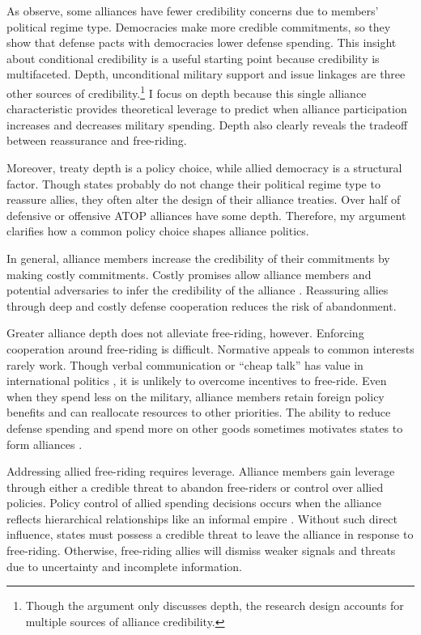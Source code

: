 \documentclass[12pt]{article}
\begin{document}
As \citet{DigiuseppePoast2016} observe, some alliances have fewer credibility concerns due to members' political regime type.
Democracies make more credible commitments, so they show that defense pacts with democracies lower defense spending.
This insight about conditional credibility is a useful starting point because credibility is multifaceted. 
Depth, unconditional military support \citep{Benson2012, Chibaetal2015} and issue linkages \citep{LongLeeds2006, Poast2012, Poast2013} are three other sources of credibility.\footnote{Though the argument only discusses depth, the research design accounts for multiple sources of alliance credibility.} 
I focus on depth because this single alliance characteristic provides theoretical leverage to predict when alliance participation increases and decreases military spending. 
Depth also clearly reveals the tradeoff between reassurance and free-riding.  


Moreover, treaty depth is a policy choice, while allied democracy is a structural factor. 
Though states probably do not change their political regime type to reassure allies, they often alter the design of their alliance treaties. 
Over half of defensive or offensive ATOP alliances have some depth. 
Therefore, my argument clarifies how a common policy choice shapes alliance politics. 


In general, alliance members increase the credibility of their commitments by making costly commitments. 
Costly promises allow alliance members and potential adversaries to infer the credibility of the alliance \citep{Leeds2003, FuhrmannSechser2014}. 
Reassuring allies through deep and costly defense cooperation reduces the risk of abandonment.


Greater alliance depth does not alleviate free-riding, however. 
Enforcing cooperation around free-riding is difficult.
Normative appeals to common interests rarely work. 
Though verbal communication or ``cheap talk'' has value in international politics \citep{Trager2010}, it is unlikely to overcome incentives to free-ride. 
Even when they spend less on the military, alliance members retain foreign policy benefits and can reallocate resources to other priorities. 
The ability to reduce defense spending and spend more on other goods sometimes motivates states to form alliances \citep{Kimball2010, AllenDigiuseppe2013}. 


Addressing allied free-riding requires leverage. 
Alliance members gain leverage through either a credible threat to abandon free-riders or control over allied policies. 
Policy control of allied spending decisions occurs when the alliance reflects hierarchical relationships like an informal empire \citep{Lake1996}. 
Without such direct influence, states must possess a credible threat to leave the alliance in response to free-riding. 
Otherwise, free-riding allies will dismiss weaker signals and threats due to uncertainty and incomplete information. 
\end{document}
